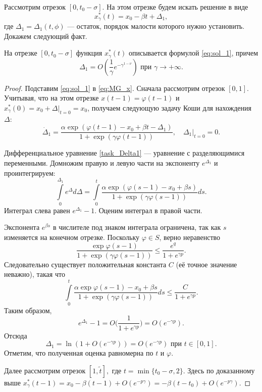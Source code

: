 Рассмотрим отрезок $[0, t_0 - \sigma]$. На этом отрезке будем искать решение в виде
%
\begin{equation}
	\label{eq:sol_1}
	x_\gamma^*(t) = x_0 - \beta t + \Delta_1,
\end{equation}
%
где $\Delta_1 = \Delta_1(t, \phi)$ --- остаток, порядок малости которого нужно установить. Докажем следующий факт.
%
\begin{lemma}
\label{lm:Delta1}
На отрезке $[0, t_0 - \sigma]$ функция $x_\gamma^*(t)$ описывается формулой \eqref{eq:sol_1}, причем
%
\[
\Delta_1 = O(\frac{1}{\gamma} e^{-\gamma^{1 - \nu}}) \text{ при } \gamma \to +\infty.
\]
\end{lemma}
\begin{proof}
Подставим \eqref{eq:sol_1} в \eqref{eq:MG_x}. Сначала рассмотрим отрезок $[0,1]$. Учитывая, что на этом отрезке $x(t-1) = \varphi(t-1)$ и $x_\gamma^*(0)=x_0 +\Delta|_{t=0}=x_0$, получаем следующую задачу Коши для нахождения $\Delta$: 
\begin{equation}
	\label{task_Delta1}
	\dot{\Delta}_1=\frac{\alpha \exp(\varphi(t-1)-x_0+\beta t-\Delta_1)}{1+\exp(\gamma\varphi(t-1))},\quad \Delta_1|_{t=0}=0.
\end{equation}

Дифференциальное уравнение \eqref{task_Delta1} --- уравнение с разделяющимися переменными. Домножим правую и левую части на экспоненту $e^{\Delta_1}$ и проинтегрируем:
%
\[
\int\limits_0^{\Delta_1} e^\Delta d\Delta=\int\limits_0^t \frac{\alpha \exp(\varphi(s-1) - x_0 + \beta s)}{1 + \exp(\gamma\varphi(s - 1))}ds.
\]
%
Интеграл слева равен $e^{\Delta_1} - 1$. Оценим интеграл в правой части.

Экспонента $e^{\beta s}$ в числителе под знаком интеграла ограничена, так как $s$ изменяется на конечном отрезке. Поскольку $\varphi\in S$, верно неравенство
%
\[
\frac{\exp\varphi(s - 1)}{1 + \exp(\gamma\varphi(s - 1))} \leqslant \frac{e^q}{1 + e^{\gamma p}}.
\]
Следовательно существует положительная константа $C$ (её точное значение неважно), такая что
\[
\int\limits_0^t\frac{\alpha\exp\varphi(s-1)-x_0+\beta s}{1+\exp(\gamma\varphi(s-1))}ds\leqslant\frac{C}{1+e^{\gamma p}}.
\]
%
Таким образом, 
\[
e^{\Delta_1}-1=O\Big(\frac{1}{1+e^{\gamma p}}\Big)=O(e^{-\gamma p}).
\]
Отсюда 
\[
\Delta_1=\ln(1+O(e^{-\gamma p}))=O(e^{-\gamma p}) \text{ при }t\in[0,1].
\]
Отметим, что полученная оценка равномерна по $t$ и $\varphi$.

Далее рассмотрим отрезок $[1, \tilde{t}],$ где $t = \min\{t_0 - \sigma, 2\}$. Здесь по доказанному выше $x_\gamma^*(t-1)=x_0-\beta (t-1)+O(e^{-p\gamma})=-\beta (t-t_0)+O(e^{-p\gamma})$.



\end{proof}
